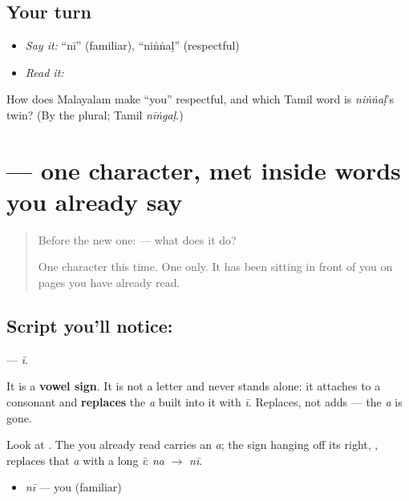 \subsection*{Your turn}
\begin{itemize}
\raggedright
  \item \emph{Say it:} \textquotedblleft{}nī\textquotedblright{} (familiar), \textquotedblleft{}niṅṅaḷ\textquotedblright{} (respectful)
  \item \emph{Read it:} \textbf{}
\end{itemize}

\begin{tcolorbox}[breakable,colback=teal!4,colframe=teal!35!black,title={Before you move on}]
How does Malayalam make \textquotedblleft{}you\textquotedblright{} respectful, and which Tamil word is \emph{niṅṅaḷ}'s twin? (By the plural; Tamil \emph{nīṅgaḷ}.)
\end{tcolorbox}
\section[\texorpdfstring{\ml{ീ} (ī)}{ീ (ī)}]{ — one character, met inside words you already say}

\label{lesson:ML-S138-vowel-sign-ii}



\begin{quote}
Before the new one:  — what does it do?

One character this time. One only. It has been sitting in front of you on pages you have already read.
\end{quote}

\subsection*{Script you'll notice: }
\textbf{} — \emph{ī}.

It is a \textbf{vowel sign}. It is not a letter and never stands alone: it attaches to a consonant and \textbf{replaces} the \emph{a} built into it with \emph{ī}. Replaces, not adds — the \emph{a} is gone.

Look at \textbf{}. The \textbf{} you already read carries an \emph{a}; the sign hanging off its right, \textbf{}, replaces that \emph{a} with a long \emph{ī}: \emph{na} $\to$ \emph{nī}.

\begin{itemize}
\raggedright
  \item \textbf{} \emph{nī} — you (familiar)
\end{itemize}


